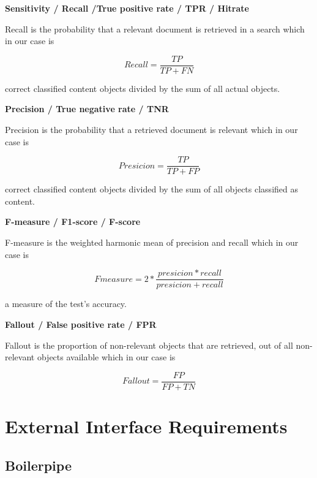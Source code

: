 \textbf{ Sensitivity / Recall /True positive rate / TPR / Hitrate }

Recall is the probability that a relevant document is retrieved in a search which in our case is

\begin{equation}
 Recall =\frac{TP}{TP + FN}
\end{equation}

correct classified content objects divided by the sum of all actual objects.

\textbf{Precision / True negative rate / TNR} 


Precision is the probability that a retrieved document is relevant which in our case is

\begin{equation}
 Presicion = \frac{TP}{TP + FP}
\end{equation}

correct classified content objects divided by the sum of all objects classified as content.

\textbf{F-measure / F1-score / F-score} 

F-measure is the weighted harmonic mean of precision and recall which in our case is

\begin{equation}
Fmeasure =  2* \frac{presicion * recall}{presicion + recall}
\end{equation}

a measure of the test's accuracy.



\textbf{Fallout / False positive rate / FPR}

Fallout is the proportion of non-relevant objects that are retrieved, out of all non-relevant objects available which in our case is

\begin{equation}
Fallout = \frac{FP}{FP + TN}
\end{equation}




\section{External Interface Requirements}

\subsection{Boilerpipe}


